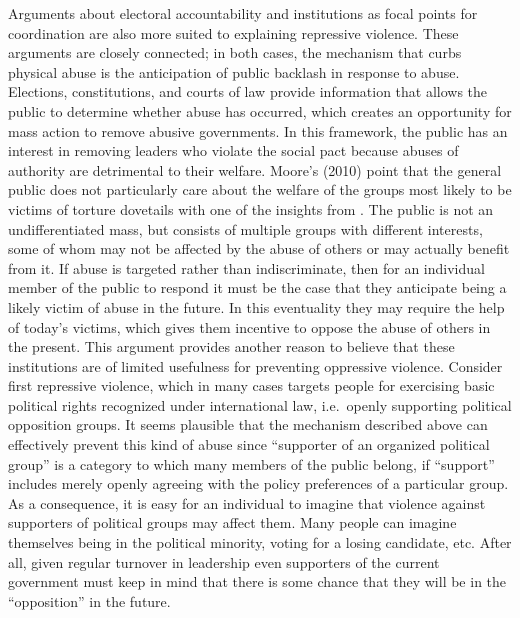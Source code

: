 \documentclass[11pt]{article}
\begin{document}
Arguments about electoral accountability and institutions as focal points for coordination are also more suited to explaining repressive violence. These arguments are closely connected; in both cases, the mechanism that curbs physical abuse is the anticipation of public backlash in response to abuse. Elections, constitutions, and courts of law provide information that allows the public to determine whether abuse has occurred, which creates an opportunity for mass action to remove abusive governments. In this framework, the public has an interest in removing leaders who violate the social pact because abuses of authority are detrimental to their welfare. Moore's (2010) point that the general public does not particularly care about the welfare of the groups most likely to be victims of torture dovetails with one of the insights from \citet{Weingast1997}. The public is not an undifferentiated mass, but consists of multiple groups with different interests, some of whom may not be affected by the abuse of others or may actually benefit from it. If abuse is targeted rather than indiscriminate, then for an individual member of the public to respond it must be the case that they anticipate being a likely victim of abuse in the future. In this eventuality they may require the help of today's victims, which gives them incentive to oppose the abuse of others in the present. This argument provides another reason to believe that these institutions are of limited usefulness for preventing oppressive violence. Consider first repressive violence, which in many cases targets people for exercising basic political rights recognized under international law, i.e.\ openly supporting political opposition groups. It seems plausible that the mechanism described above can effectively prevent this kind of abuse since ``supporter of an organized political group'' is a category to which many members of the public belong, if ``support'' includes merely openly agreeing with the policy preferences of a particular group. As a consequence, it is easy for an individual to imagine that violence against supporters of political groups may affect them. Many people can imagine themselves being in the political minority, voting for a losing candidate, etc. After all, given regular turnover in leadership even supporters of the current government must keep in mind that there is some chance that they will be in the ``opposition'' in the future. 
\end{document}
